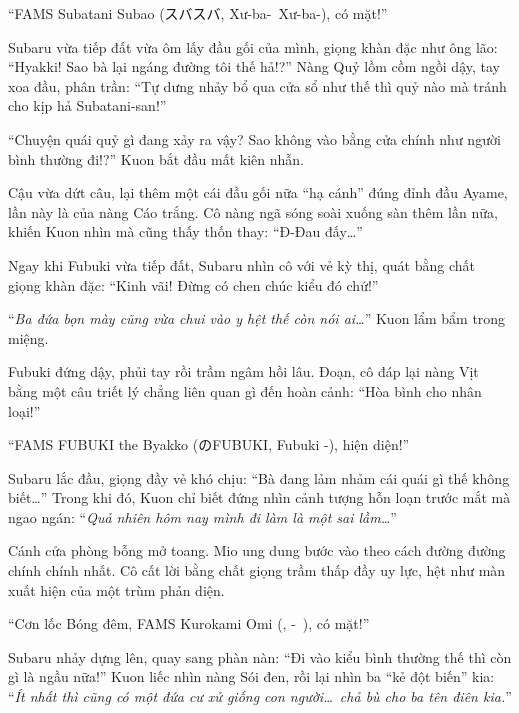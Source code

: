 \documentclass[../main.tex]{subfiles}
\begin{document}

``FAMS Subatani Subao (スバスバ, Xư-ba-\ Xư-ba-), có mặt!''

Subaru vừa tiếp đất vừa ôm lấy đầu gối của mình, giọng khàn đặc như ông lão: ``Hyakki! Sao bà lại ngáng đường tôi thế hả!?'' Nàng Quỷ lồm cồm ngồi dậy, tay xoa đầu, phân trần:
``Tự dưng nhảy bổ qua cửa sổ như thế thì quỷ nào mà tránh cho kịp hả Subatani-san!''

``Chuyện quái quỷ gì đang xảy ra vậy? Sao không vào bằng cửa chính như người bình thường đi!?'' Kuon bắt đầu mất kiên nhẫn.

Cậu vừa dứt câu, lại thêm một cái đầu gối nữa ``hạ cánh'' đúng đỉnh đầu Ayame, lần này là của nàng Cáo trắng. Cô nàng ngã sóng soài xuống sàn thêm lần nữa, khiến Kuon nhìn mà cũng thấy thốn thay: ``Đ-Đau đấy\dots''

Ngay khi Fubuki vừa tiếp đất, Subaru nhìn cô với vẻ kỳ thị, quát bằng chất giọng khàn đặc: ``Kinh vãi! Đừng có chen chúc kiểu đó chứ!''

``\textit{Ba đứa bọn mày cũng vừa chui vào y hệt thế còn nói ai\dots}'' Kuon lẩm bẩm trong miệng.

Fubuki đứng dậy, phủi tay rồi trầm ngâm hồi lâu. Đoạn, cô đáp lại nàng Vịt bằng một câu triết lý chẳng liên quan gì đến hoàn cảnh: ``Hòa bình cho nhân loại!''


``FAMS FUBUKI the Byakko (のFUBUKI, Fubuki -), hiện diện!''

Subaru lắc đầu, giọng đầy vẻ khó chịu: ``Bà đang lảm nhảm cái quái gì thế không biết\dots'' Trong khi đó, Kuon chỉ biết đứng nhìn cảnh tượng hỗn loạn trước mắt mà ngao ngán: ``\textit{Quả nhiên hôm nay mình đi làm là một sai lầm\dots}''

Cánh cửa phòng bỗng mở toang. Mio ung dung bước vào theo cách đường đường chính chính nhất. Cô cất lời bằng chất giọng trầm thấp đầy uy lực, hệt như màn xuất hiện của một trùm phản diện.


``Cơn lốc Bóng đêm, FAMS Kurokami Omi (, -\ ), có mặt!''

Subaru nhảy dựng lên, quay sang phàn nàn: ``Đi vào kiểu bình thường thế thì còn gì là ngầu nữa!'' Kuon liếc nhìn nàng Sói đen, rồi lại nhìn ba ``kẻ đột biến'' kia: ``\textit{Ít nhất thì cũng có một đứa cư xử giống con người\dots\ chả bù cho ba tên điên kia.}''
\end{document}

